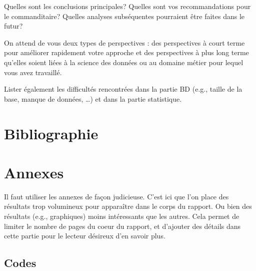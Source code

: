 \documentclass[mstat,12pt]{unswthesis}
\begin{document}
Quelles sont les conclusions principales? Quelles sont vos
recommandations pour le commanditaire? Quelles analyses subséquentes
pourraient être faites dans le futur?

\bigskip

On attend de vous deux types de perspectives : des perspectives à court
terme pour améliorer rapidement votre approche et des perspectives à
plus long terme qu'elles soient liées à la science des données ou au
domaine métier pour lequel vous avez travaillé.

\bigskip

Lister également les difficultés rencontrées dans la partie BD (e.g.,
taille de la base, manque de données, \ldots) et dans la partie
statistique.

\chapter*{Bibliographie}\label{bibliographie}

\label{refs}
\begin{CSLReferences}{0}{1}
\end{CSLReferences}




\chapter*{Annexes}\label{annexes}

Il faut utiliser les annexes de façon judicieuse. C'est ici que l'on
place des résultats trop volumineux pour apparaître dans le corps du
rapport. Ou bien des résultats (e.g., graphiques) moins intéressants que
les autres. Cela permet de limiter le nombre de pages du coeur du
rapport, et d'ajouter des détails dans cette partie pour le lecteur
désireux d'en savoir plus.

\section*{\texorpdfstring{\textbf{Codes}}{Codes}}\label{codes}

\tiny
\end{document}
